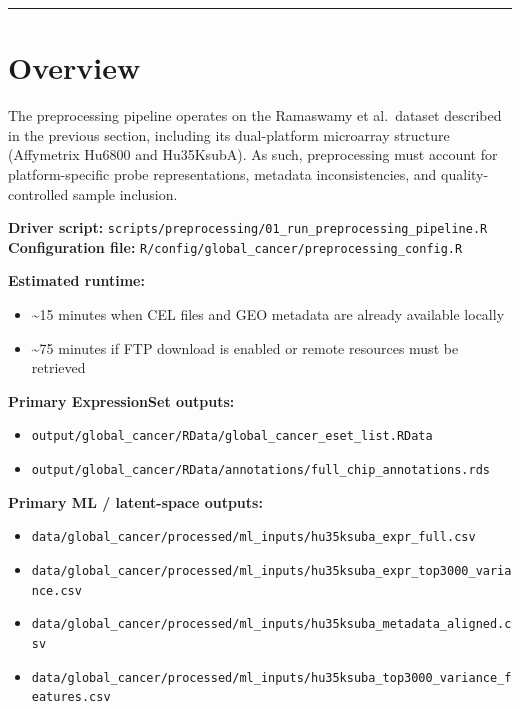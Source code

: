 \documentclass[
  letterpaper,
  DIV=11,
  numbers=noendperiod,
  openany,
  oneside]{scrreprt}
\providecommand{\tightlist}{%
  \setlength{\itemsep}{0pt}\setlength{\parskip}{0pt}}
\begin{document}
\begin{center}\rule{0.5\linewidth}{0.5pt}\end{center}

\section*{Overview}\label{overview-3}


The preprocessing pipeline operates on the Ramaswamy et al.~dataset
described in the previous section, including its dual-platform
microarray structure (Affymetrix Hu6800 and Hu35KsubA). As such,
preprocessing must account for platform-specific probe representations,
metadata inconsistencies, and quality-controlled sample inclusion.

\textbf{Driver script:}
\texttt{scripts/preprocessing/01\_run\_preprocessing\_pipeline.R}\\
\textbf{Configuration file:}
\texttt{R/config/global\_cancer/preprocessing\_config.R}

\textbf{Estimated runtime:}

\begin{itemize}
\tightlist
\item
  \textasciitilde15 minutes when CEL files and GEO metadata are already
  available locally
\item
  \textasciitilde75 minutes if FTP download is enabled or remote
  resources must be retrieved
\end{itemize}

\textbf{Primary ExpressionSet outputs:}

\begin{itemize}
\tightlist
\item
  \texttt{output/global\_cancer/RData/global\_cancer\_eset\_list.RData}
\item
  \texttt{output/global\_cancer/RData/annotations/full\_chip\_annotations.rds}
\end{itemize}

\textbf{Primary ML / latent-space outputs:}

\begin{itemize}
\tightlist
\item
  \texttt{data/global\_cancer/processed/ml\_inputs/hu35ksuba\_expr\_full.csv}
\item
  \texttt{data/global\_cancer/processed/ml\_inputs/hu35ksuba\_expr\_top3000\_variance.csv}
\item
  \texttt{data/global\_cancer/processed/ml\_inputs/hu35ksuba\_metadata\_aligned.csv}
\item
  \texttt{data/global\_cancer/processed/ml\_inputs/hu35ksuba\_top3000\_variance\_features.csv}
\end{itemize}
\end{document}
